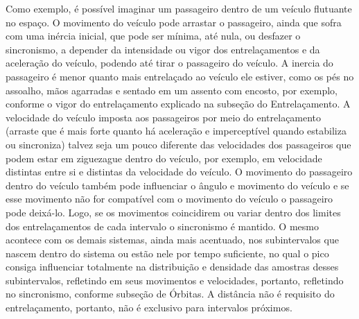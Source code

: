 Como exemplo, é possível imaginar um passageiro dentro de um veículo flutuante no espaço. O movimento do veículo pode arrastar o passageiro, ainda que sofra com uma inércia inicial, que pode ser mínima, até nula, ou desfazer o sincronismo, a depender da intensidade ou vigor dos entrelaçamentos e da aceleração do veículo, podendo até tirar o passageiro do veículo. A inercia do passageiro é menor quanto mais entrelaçado ao veículo ele estiver, como os pés no assoalho, mãos agarradas e sentado em um assento com encosto, por exemplo, conforme o vigor do entrelaçamento explicado na subseção do Entrelaçamento. A velocidade do veículo imposta aos passageiros por meio do entrelaçamento (arraste que é mais forte quanto há aceleração e imperceptível quando estabiliza ou sincroniza) talvez seja um pouco diferente das velocidades dos passageiros que podem estar em ziguezague dentro do veículo, por exemplo, em velocidade distintas entre si e distintas da velocidade do veículo. O movimento do passageiro dentro do veículo também pode influenciar o ângulo e movimento do veículo e se esse movimento não for compatível com o movimento do veículo o passageiro pode deixá-lo. Logo, se os movimentos coincidirem ou variar dentro dos limites dos entrelaçamentos de cada intervalo o sincronismo é mantido. O mesmo acontece com os demais sistemas, ainda mais acentuado, nos subintervalos que nascem dentro do sistema ou estão nele por tempo suficiente, no qual o pico consiga influenciar totalmente na distribuição e densidade das amostras desses subintervalos, refletindo em seus movimentos e velocidades, portanto, refletindo no sincronismo, conforme subseção de Órbitas. A distância não é requisito do entrelaçamento, portanto, não é exclusivo para intervalos próximos.

